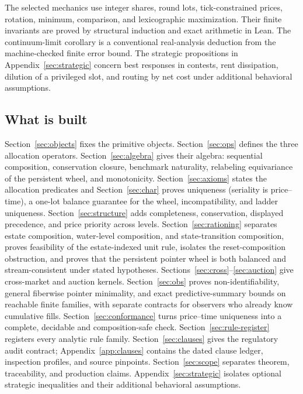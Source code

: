 \documentclass[11pt]{article}
\theoremstyle{definition}
\theoremstyle{remark}
\begin{document}
The selected mechanics use integer shares, round lots, tick-constrained prices, rotation, minimum, comparison, and lexicographic maximization. Their finite invariants are proved by structural induction and exact arithmetic in Lean. The continuum-limit corollary is a conventional real-analysis deduction from the machine-checked finite error bound. The strategic propositions in Appendix~\ref{sec:strategic} concern best responses in contests, rent dissipation, dilution of a privileged slot, and routing by net cost under additional behavioral assumptions.

\subsection{What is built}
Section~\ref{sec:objects} fixes the primitive objects. Section~\ref{sec:ops} defines the three allocation operators. Section~\ref{sec:algebra} gives their algebra: sequential composition, conservation closure, benchmark naturality, relabeling equivariance of the persistent wheel, and monotonicity. Section~\ref{sec:axioms} states the allocation predicates and Section~\ref{sec:char} proves uniqueness (seriality is price--time), a one-lot balance guarantee for the wheel, incompatibility, and ladder uniqueness. Section~\ref{sec:structure} adds completeness, conservation, displayed precedence, and price priority across levels. Section~\ref{sec:rationing} separates estate composition, water-level composition, and state-transition composition, proves feasibility of the estate-indexed unit rule, isolates the reset-composition obstruction, and proves that the persistent pointer wheel is both balanced and stream-consistent under stated hypotheses. Sections~\ref{sec:cross}--\ref{sec:auction} give cross-market and auction kernels. Section~\ref{sec:obs} proves non-identifiability, general fiberwise pointer minimality, and exact predictive-summary bounds on reachable finite families, with separate contracts for observers who already know cumulative fills. Section~\ref{sec:conformance} turns price--time uniqueness into a complete, decidable and composition-safe check. Section~\ref{sec:rule-register} registers every analytic rule family. Section~\ref{sec:clauses} gives the regulatory audit contract; Appendix~\ref{app:clauses} contains the dated clause ledger, inspection profiles, and source pinpoints. Section~\ref{sec:scope} separates theorem, traceability, and production claims. Appendix~\ref{sec:strategic} isolates optional strategic inequalities and their additional behavioral assumptions.
\end{document}
